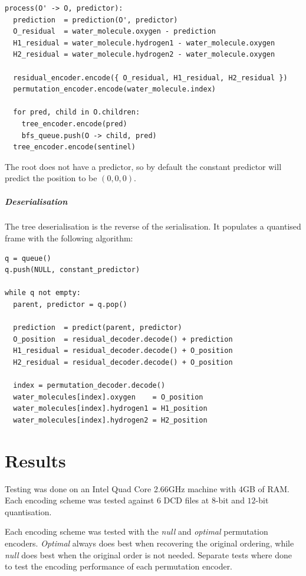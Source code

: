 \documentclass{report}
\begin{document}
\begin{verbatim}
process(O' -> O, predictor):
  prediction  = prediction(O', predictor)
  O_residual  = water_molecule.oxygen - prediction
  H1_residual = water_molecule.hydrogen1 - water_molecule.oxygen
  H2_residual = water_molecule.hydrogen2 - water_molecule.oxygen

  residual_encoder.encode({ O_residual, H1_residual, H2_residual })
  permutation_encoder.encode(water_molecule.index)

  for pred, child in O.children:
    tree_encoder.encode(pred)
    bfs_queue.push(O -> child, pred)
  tree_encoder.encode(sentinel)
\end{verbatim}

The root does not have a predictor, so by default the constant predictor will
predict the position to be $(0,0,0)$.


\paragraph{Deserialisation}

The tree deserialisation is the reverse of the serialisation. It populates a
quantised frame with the following algorithm:

\begin{verbatim}
q = queue()
q.push(NULL, constant_predictor)

while q not empty:
  parent, predictor = q.pop()

  prediction  = predict(parent, predictor)
  O_position  = residual_decoder.decode() + prediction
  H1_residual = residual_decoder.decode() + O_position
  H2_residual = residual_decoder.decode() + O_position

  index = permutation_decoder.decode()
  water_molecules[index].oxygen    = O_position
  water_molecules[index].hydrogen1 = H1_position
  water_molecules[index].hydrogen2 = H2_position
\end{verbatim}

\chapter{Results}

Testing was done on an Intel Quad Core 2.66GHz machine with 4GB of RAM. Each
encoding scheme was tested against 6 DCD files at $8$-bit and $12$-bit
quantisation.

Each encoding scheme was tested with the \emph{null} and \emph{optimal}
permutation encoders. \emph{Optimal} always does best when recovering the
original ordering, while \emph{null} does best when the original order is not
needed. Separate tests where done to test the encoding performance of each
permutation encoder.
\end{document}
